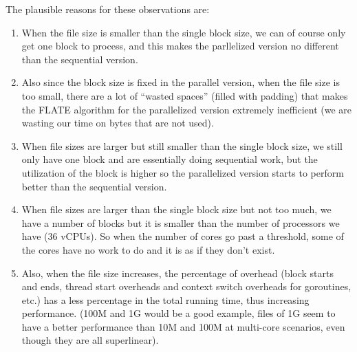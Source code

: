 \documentclass[12pt]{article}
\begin{document}
    The plausible reasons for these observations are:
    \begin{enumerate}
        \item When the file size is smaller than the single block size, we can of course only get one block to process, and this makes the parllelized version no different than the sequential version.
        \item Also since the block size is fixed in the parallel version, when the file size is too small, there are a lot of ``wasted spaces'' (filled with padding) that makes the FLATE algorithm for the parallelized version extremely inefficient (we are wasting our time on bytes that are not used).
        \item When file sizes are larger but still smaller than the single block size, we still only have one block and are essentially doing sequential work, but the utilization of the block is higher so the parallelized version starts to perform better than the sequential version.
        \item When file sizes are larger than the single block size but not too much, we have a number of blocks but it is smaller than the number of processors we have (36 vCPUs). So when the number of cores go past a threshold, some of the cores have no work to do and it is as if they don't exist.
        \item Also, when the file size increases, the percentage of overhead (block starts and ends, thread start overheads and context switch overheads for goroutines, etc.) has a less percentage in the total running time, thus increasing performance. (100M and 1G would be a good example, files of 1G seem to have a better performance than 10M and 100M at multi-core scenarios, even though they are all superlinear).
    \end{enumerate}
\end{document}
